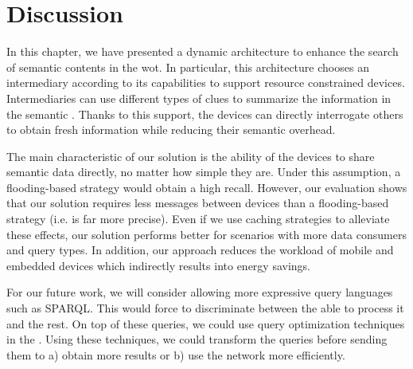 \section{Discussion}
\label{sec:search_discussion}

In this chapter, we have presented a dynamic architecture to enhance the search of semantic contents in the \acl{wot}.
In particular, this architecture chooses an intermediary according to its capabilities to support resource constrained devices.
Intermediaries can use different types of clues to summarize the information in the semantic \Space{}.
Thanks to this support, the devices can directly interrogate others to obtain fresh information while reducing their semantic overhead.

The main characteristic of our solution is the ability of the devices to share semantic data directly, no matter how simple they are. %
Under this assumption, a flooding-based strategy would obtain a high recall. %
However, our evaluation shows that our solution requires less messages between devices than a flooding-based strategy (i.e. is far more precise).
Even if we use caching strategies to alleviate these effects, our solution performs better for scenarios with more data consumers and query types.
In addition, our approach reduces the workload of mobile and embedded devices which indirectly results into energy savings.

For our future work, we will consider allowing more expressive query languages such as SPARQL. %
This would force \consumers{} to discriminate between the \providers{} able to process it and the rest.
On top of these queries, we could use query optimization techniques in the \consumers{} \citep{schwarte_fedx_optimization_2011}.
Using these techniques, we could transform the queries before sending them to a) obtain more results or b) use the network more efficiently.